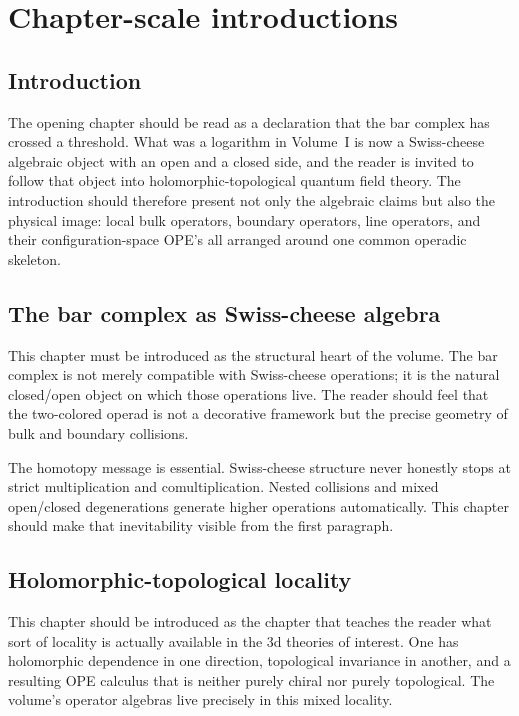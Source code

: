 \section*{Chapter-scale introductions}

\subsection*{Introduction}
The opening chapter should be read as a declaration that the bar complex has crossed a threshold.  What was a logarithm in Volume~I is now a Swiss-cheese algebraic object with an open and a closed side, and the reader is invited to follow that object into holomorphic-topological quantum field theory.  The introduction should therefore present not only the algebraic claims but also the physical image: local bulk operators, boundary operators, line operators, and their configuration-space OPE's all arranged around one common operadic skeleton.

\subsection*{The bar complex as Swiss-cheese algebra}
This chapter must be introduced as the structural heart of the volume.  The bar complex is not merely compatible with Swiss-cheese operations; it is the natural closed/open object on which those operations live.  The reader should feel that the two-colored operad is not a decorative framework but the precise geometry of bulk and boundary collisions.

The homotopy message is essential.  Swiss-cheese structure never honestly stops at strict multiplication and comultiplication.  Nested collisions and mixed open/closed degenerations generate higher operations automatically.  This chapter should make that inevitability visible from the first paragraph.

\subsection*{Holomorphic-topological locality}
This chapter should be introduced as the chapter that teaches the reader what sort of locality is actually available in the 3d theories of interest.  One has holomorphic dependence in one direction, topological invariance in another, and a resulting OPE calculus that is neither purely chiral nor purely topological.  The volume's operator algebras live precisely in this mixed locality.


